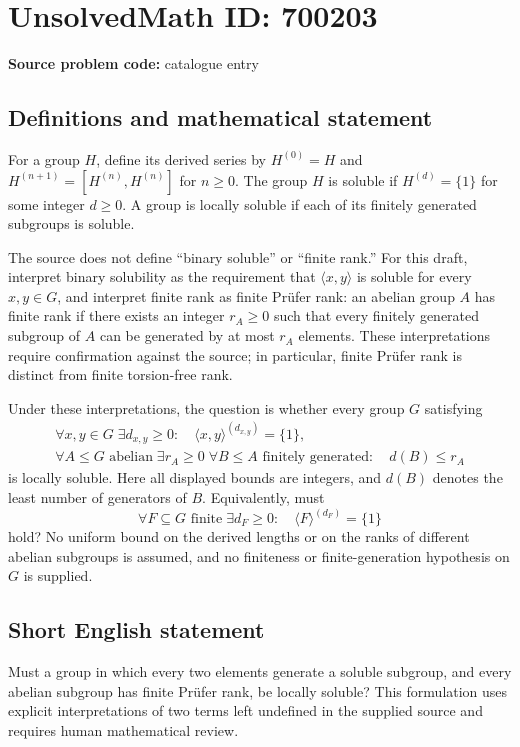 \documentclass[11pt]{article}
\begin{document}
\section*{UnsolvedMath ID: 700203}
\textbf{Source problem code:} catalogue entry
\subsection{Definitions and mathematical statement}
For a group \(H\), define its derived series by \(H^{(0)}=H\) and \(H^{(n+1)}=[H^{(n)},H^{(n)}]\) for \(n\geq 0\). The group \(H\) is soluble if \(H^{(d)}=\{1\}\) for some integer \(d\geq 0\). A group is locally soluble if each of its finitely generated subgroups is soluble.

The source does not define ``binary soluble'' or ``finite rank.'' For this draft, interpret binary solubility as the requirement that \(\langle x,y\rangle\) is soluble for every \(x,y\in G\), and interpret finite rank as finite Pr\"ufer rank: an abelian group \(A\) has finite rank if there exists an integer \(r_A\geq 0\) such that every finitely generated subgroup of \(A\) can be generated by at most \(r_A\) elements. These interpretations require confirmation against the source; in particular, finite Pr\"ufer rank is distinct from finite torsion-free rank.

Under these interpretations, the question is whether every group \(G\) satisfying
\[
\begin{gathered}
\forall x,y\in G\;\exists d_{x,y}\geq 0:
\quad \langle x,y\rangle^{(d_{x,y})}=\{1\},\\
\forall A\leq G\text{ abelian}\;\exists r_A\geq 0\;
\forall B\leq A\text{ finitely generated}:\quad d(B)\leq r_A
\end{gathered}
\]
is locally soluble. Here all displayed bounds are integers, and \(d(B)\) denotes the least number of generators of \(B\). Equivalently, must
\[
\forall F\subseteq G\text{ finite}\;\exists d_F\geq 0:
\quad \langle F\rangle^{(d_F)}=\{1\}
\]
hold? No uniform bound on the derived lengths or on the ranks of different abelian subgroups is assumed, and no finiteness or finite-generation hypothesis on \(G\) is supplied.
\subsection{Short English statement}
Must a group in which every two elements generate a soluble subgroup, and every abelian subgroup has finite Pr\"ufer rank, be locally soluble? This formulation uses explicit interpretations of two terms left undefined in the supplied source and requires human mathematical review.
\end{document}
